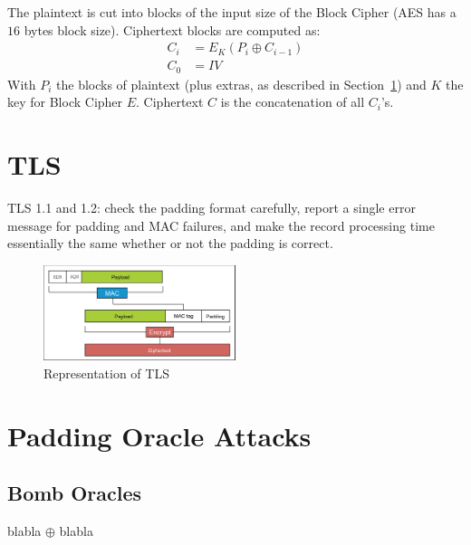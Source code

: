 \documentclass[10pt,conference,a4paper]{IEEEtran}
\begin{document}
The plaintext is cut into blocks of the input size of the Block Cipher (AES has a $16$ bytes block size). Ciphertext blocks are computed as:
\[ 
\begin{split}
C_i &= E_K(P_i \oplus C_{i-1}) \\
C_0 &= IV 
\end{split}
\]
With $P_i$ the blocks of plaintext (plus extras, as described in Section~\ref{sec:TLS}) and $K$ the key for Block Cipher $E$. Ciphertext $C$ is the concatenation of all $C_i$'s.

\section{TLS}
\label{sec:TLS}
TLS 1.1 and 1.2: check the padding format carefully, report a single error message for padding and MAC failures, and make the record processing time essentially the same whether or not the padding is correct.

\begin{figure}[h]
	\centering
	\includegraphics[width=0.5\textwidth]{tls-representation.jpg}
	\caption{Representation of TLS~\cite{alfardan2013lucky}}
	\label{fig:tls}
\end{figure}

\section{Padding Oracle Attacks}
\label{sec:paddingoracle}

\subsection{}

\subsection{Bomb Oracles}
\label{sec:paddingoracle:bomb}
blabla $\oplus$ blabla
\end{document}
